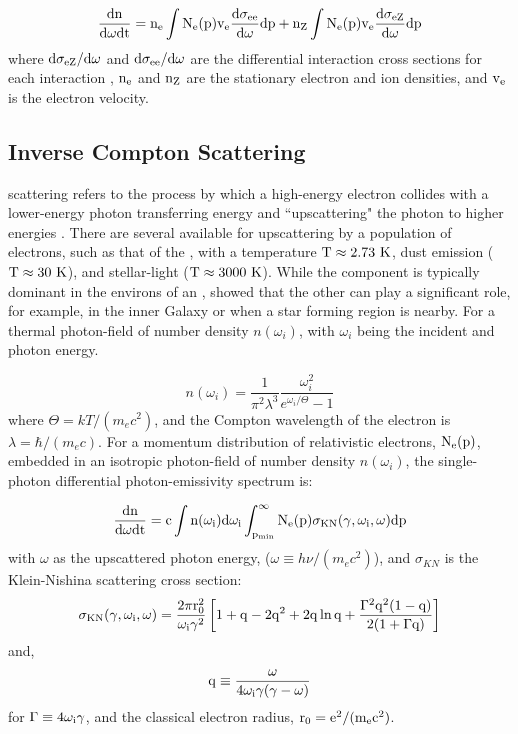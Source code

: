 \begin{equation}
{\rm \frac{d n}{d \omega d t} =
	n_e \int
	N_e(p) v_e
	\frac{d \sigma_{e e}}{d \omega}dp +
	n_Z \int
	N_e(p) v_e
	\frac{d \sigma_{e Z}}{d \omega}dp}
\end{equation}
where ${\rm d \sigma_{e Z}/d \omega}$ and ${\rm d \sigma_{e e}/d \omega}$ are the differential interaction cross sections for each interaction \citep{Koch59,Haug75}, ${\rm n_e}$ and ${\rm n_Z}$ are the stationary electron and ion densities, and ${\rm v_e}$ is the electron velocity.

\subsection{Inverse Compton Scattering}\label{gamAstr:IC}

\ic{} scattering refers to the process by which a high-energy electron collides with a lower-energy photon transferring energy and ``upscattering" the photon to higher energies \citep{Blumenthal70}. 
There are several \isrfs{} available for upscattering by a population of electrons, such as that of the \cmb{}, with a temperature ${\rm T \approx 2.73~K}$,  \fir{} dust emission (${\rm T \approx 30~K}$), and \nir{} stellar-light (${\rm T \approx 3000~K}$). While the \cmb{} component is typically dominant  in the environs of an \snr{}, \cite{Porter06} showed that the other \isrfs{} can play a significant role, for example, in the inner Galaxy or when a star forming region is nearby. For a thermal photon-field of number density $n(\omega_i)$, with $\omega_i$ being the incident and photon energy.

\begin{equation}
n(\omega_i) = 
\frac{1}{\pi^2\lambda^3} 
\frac{\omega_i^2}{e^{\omega_i/\Theta} -1}
\end{equation}
where  $\Theta=kT/(m_e c^2)$, and the Compton wavelength of the electron is $\lambda=\hbar/(m_e c)$.
For a momentum distribution of relativistic electrons, ${\rm N_e(p)}$, embedded in an isotropic photon-field of number density $n(\omega_i)$, the single-photon differential photon-emissivity spectrum is:

\begin{equation}
{\rm \frac{dn}{d\omega dt} = 
c \int  n(\omega_i)d \omega_i
\int_{p_{min}}^\infty 
N_e(p)  \sigma_{KN}(\gamma,\omega_i,\omega)dp}
\end{equation}
with $\omega$ as the upscattered photon energy, ($\omega\equiv h\nu/(m_e c^2)$), and $\sigma_{KN}$ is the Klein-Nishina scattering  cross section:
\begin{equation}
{\rm \sigma_{KN}(\gamma,\omega_i,\omega) = \frac{2\pi r_0^2}{\omega_i \gamma^2}
\left[
1 + q - 2q^2 + 2q\ln q + \frac{\Gamma^2 q^2 (1-q)}{2(1+\Gamma q)}
\right]}
\end{equation}
and,
\begin{equation}
{\rm q \equiv \frac{\omega}{4 \omega_i \gamma (\gamma-\omega)}}
\end{equation}
for ${\rm \Gamma \equiv 4\omega_i \gamma}$, and the classical electron radius, ${\rm r_0 = e^2/(m_e c^2)}$.

